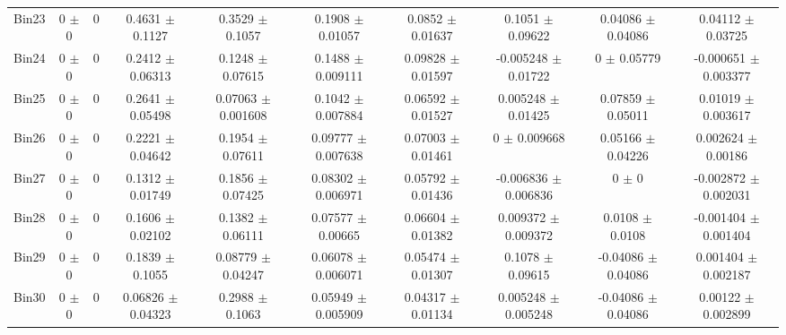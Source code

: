 \begin{tabular}{@{\extracolsep{4pt}}lccccccccc@{}}
     Bin23 & 0 $\pm$ 0 & 0 & 0.4631 $\pm$ 0.1127 & 0.3529 $\pm$ 0.1057 & 0.1908 $\pm$ 0.01057 & 0.0852 $\pm$ 0.01637 & 0.1051 $\pm$ 0.09622 & 0.04086 $\pm$ 0.04086 & 0.04112 $\pm$ 0.03725 \\ 
     Bin24 & 0 $\pm$ 0 & 0 & 0.2412 $\pm$ 0.06313 & 0.1248 $\pm$ 0.07615 & 0.1488 $\pm$ 0.009111 & 0.09828 $\pm$ 0.01597 & -0.005248 $\pm$ 0.01722 & 0 $\pm$ 0.05779 & -0.000651 $\pm$ 0.003377 \\ 
     Bin25 & 0 $\pm$ 0 & 0 & 0.2641 $\pm$ 0.05498 & 0.07063 $\pm$ 0.001608 & 0.1042 $\pm$ 0.007884 & 0.06592 $\pm$ 0.01527 & 0.005248 $\pm$ 0.01425 & 0.07859 $\pm$ 0.05011 & 0.01019 $\pm$ 0.003617 \\ 
     Bin26 & 0 $\pm$ 0 & 0 & 0.2221 $\pm$ 0.04642 & 0.1954 $\pm$ 0.07611 & 0.09777 $\pm$ 0.007638 & 0.07003 $\pm$ 0.01461 & 0 $\pm$ 0.009668 & 0.05166 $\pm$ 0.04226 & 0.002624 $\pm$ 0.00186 \\ 
     Bin27 & 0 $\pm$ 0 & 0 & 0.1312 $\pm$ 0.01749 & 0.1856 $\pm$ 0.07425 & 0.08302 $\pm$ 0.006971 & 0.05792 $\pm$ 0.01436 & -0.006836 $\pm$ 0.006836 & 0 $\pm$ 0 & -0.002872 $\pm$ 0.002031 \\ 
     Bin28 & 0 $\pm$ 0 & 0 & 0.1606 $\pm$ 0.02102 & 0.1382 $\pm$ 0.06111 & 0.07577 $\pm$ 0.00665 & 0.06604 $\pm$ 0.01382 & 0.009372 $\pm$ 0.009372 & 0.0108 $\pm$ 0.0108 & -0.001404 $\pm$ 0.001404 \\ 
     Bin29 & 0 $\pm$ 0 & 0 & 0.1839 $\pm$ 0.1055 & 0.08779 $\pm$ 0.04247 & 0.06078 $\pm$ 0.006071 & 0.05474 $\pm$ 0.01307 & 0.1078 $\pm$ 0.09615 & -0.04086 $\pm$ 0.04086 & 0.001404 $\pm$ 0.002187 \\ 
     Bin30 & 0 $\pm$ 0 & 0 & 0.06826 $\pm$ 0.04323 & 0.2988 $\pm$ 0.1063 & 0.05949 $\pm$ 0.005909 & 0.04317 $\pm$ 0.01134 & 0.005248 $\pm$ 0.005248 & -0.04086 $\pm$ 0.04086 & 0.00122 $\pm$ 0.002899 \\ 
\hline\hline
  \end{tabular}
